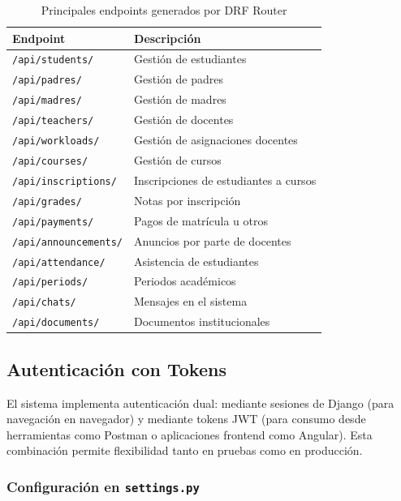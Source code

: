 \documentclass{article}
\begin{document}
\begin{table}[ht]
\centering
\begin{tabular}{|l|l|}
\hline
\rowcolor{tabledictionariesbackground!30}
\textbf{Endpoint} & \textbf{Descripción} \\
\hline
\texttt{/api/students/} & Gestión de estudiantes \\
\texttt{/api/padres/} & Gestión de padres \\
\texttt{/api/madres/} & Gestión de madres \\
\texttt{/api/teachers/} & Gestión de docentes \\
\texttt{/api/workloads/} & Gestión de asignaciones docentes \\
\texttt{/api/courses/} & Gestión de cursos \\
\texttt{/api/inscriptions/} & Inscripciones de estudiantes a cursos \\
\texttt{/api/grades/} & Notas por inscripción \\
\texttt{/api/payments/} & Pagos de matrícula u otros \\
\texttt{/api/announcements/} & Anuncios por parte de docentes \\
\texttt{/api/attendance/} & Asistencia de estudiantes \\
\texttt{/api/periods/} & Periodos académicos \\
\texttt{/api/chats/} & Mensajes en el sistema \\
\texttt{/api/documents/} & Documentos institucionales \\
\hline
\end{tabular}
\caption{Principales endpoints generados por DRF Router}
\end{table}

    \subsection{Autenticación con Tokens}

El sistema implementa autenticación dual: mediante sesiones de Django (para navegación en navegador) y mediante tokens JWT (para consumo desde herramientas como Postman o aplicaciones frontend como Angular). Esta combinación permite flexibilidad tanto en pruebas como en producción.

\subsubsection*{Configuración en \texttt{settings.py}}
\end{document}
